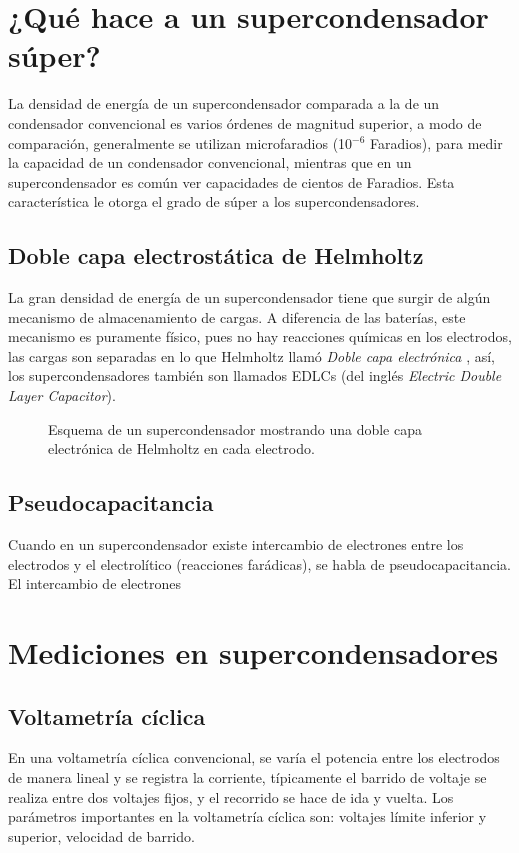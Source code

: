 \section{¿Qué hace a un supercondensador súper?}
La densidad de energía de un supercondensador comparada a la de un condensador convencional es varios órdenes de magnitud superior, a modo de comparación, generalmente se utilizan microfaradios (10$^{-6}$ Faradios), para medir la capacidad de un condensador convencional, mientras que en un supercondensador es común ver capacidades de cientos de Faradios. Esta característica le otorga el grado de súper a los supercondensadores.

\subsection{Doble capa electrostática de Helmholtz}
La gran densidad de energía de un supercondensador tiene que surgir de algún mecanismo de almacenamiento de cargas. A diferencia de las baterías, este mecanismo es puramente físico, pues no hay reacciones químicas en los electrodos, las cargas son separadas en lo que Helmholtz llamó \emph{Doble capa electrónica} \citep{Frackowiak2001}, así, los supercondensadores también son llamados EDLCs (del inglés \emph{Electric Double Layer Capacitor}).

\begin{figure}[h!]
	\centering
	\caption{Esquema de un supercondensador mostrando una doble capa electrónica de Helmholtz en cada electrodo.}
	\label{fig:edlc}
\end{figure}

\subsection{Pseudocapacitancia}
Cuando en un supercondensador existe intercambio de electrones entre los electrodos y el electrolítico (reacciones farádicas), se habla de pseudocapacitancia. El intercambio de electrones 


\section{Mediciones en supercondensadores}

\subsection{Voltametría cíclica}
En una voltametría cíclica convencional, se varía el potencia entre los electrodos de manera lineal y se registra la corriente, típicamente el barrido de voltaje se realiza entre dos voltajes fijos, y el recorrido se hace de ida y vuelta. Los parámetros importantes en la voltametría cíclica son: voltajes límite inferior y superior, velocidad de barrido.

